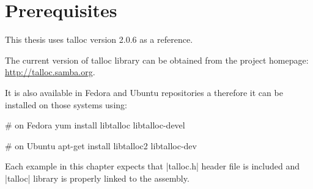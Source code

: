 \section{Prerequisites}
\label{talloc:prerequisites}

This thesis uses talloc version 2.0.6 as a reference.

The current version of talloc library can be obtained from the project homepage:
{\footnotesize\url{http://talloc.samba.org}}.

It is also available in Fedora and Ubuntu repositories a therefore it can be
installed on those systems using:

\begin{commandline}
# on Fedora
yum install libtalloc libtalloc-devel

# on Ubuntu
apt-get install libtalloc2 libtalloc-dev
\end{commandline}
\funclistend
Each example in this chapter expects that |talloc.h| header file is included and
|talloc| library is properly linked to the assembly.
